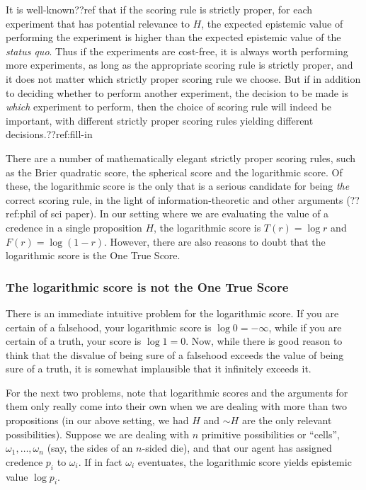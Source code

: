 It is well-known??ref that if the scoring rule is strictly proper, for each experiment that has potential relevance 
to $H$, the expected epistemic value of performing the experiment is
higher than the expected epistemic value of the \textit{status quo}. Thus if the experiments are cost-free, it is
always worth performing more experiments, as long as the appropriate scoring rule is strictly proper,
and it does not matter which strictly proper scoring rule we choose. But if in addition to deciding whether to perform
another experiment, the decision to be made is \textit{which} experiment to perform, then the choice of scoring rule
will indeed be important, with different strictly proper scoring rules yielding different decisions.??ref:fill-in

There are a number of mathematically elegant strictly proper scoring rules, such as the Brier quadratic score, the spherical score 
and the logarithmic score. Of these, the logarithmic score is the only that is a serious candidate for being \textit{the} correct
scoring rule, in the light of information-theoretic and other arguments (??ref:phil of sci paper). In our setting where we are
evaluating the value of a credence in a single proposition $H$, the logarithmic score is $T(r) = \log r$ and $F(r) = \log (1-r)$. 
However, there are also reasons to doubt that the logarithmic score is the One True Score. 

\subsubsection{The logarithmic score is not the One True Score}
There is an immediate intuitive problem for the logarithmic score. If you are certain of a falsehood, your logarithmic score is $\log 0 = -\infty$, while
if you are certain of a truth, your score is $\log 1 = 0$. Now, while there is good reason to think that the disvalue of being
sure of a falsehood exceeds the value of being sure of a truth, it is somewhat implausible that it infinitely exceeds it. 

For the next two problems, note that logarithmic scores and the arguments for them only really come into their own when we are 
dealing with more than two propositions (in our above setting, we had $H$ and $\sim H$ are the only relevant possibilities). Suppose 
we are dealing with $n$ primitive possibilities or ``cells'', $\omega_1,\dots,\omega_n$ (say, the sides of an $n$-sided die), and that our agent 
has assigned credence $p_i$ to $\omega_i$. If in fact $\omega_i$ eventuates, the logarithmic score yields epistemic value 
$\log p_i$. 


